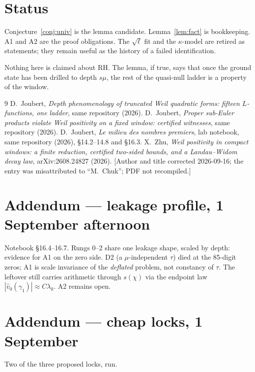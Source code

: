 \documentclass[10pt]{article}
\theoremstyle{definition}
\begin{document}
\section{Status}

Conjecture~\ref{conj:univ} is the lemma candidate. Lemma~\ref{lem:fact}
is bookkeeping. A1 and A2 are the proof obligations. The $\sqrt{\ell}$
fit and the $\kappa$-model are retired as statements; they remain
useful as the history of a failed identification.

Nothing here is claimed about RH. The lemma, if true, says that once
the ground state has been drilled to depth $s\mu$, the rest of the
quasi-null ladder is a property of the window.

\begin{thebibliography}{9}\small
{} D.~Joubert, \emph{Depth phenomenology of truncated Weil
quadratic forms: fifteen $L$-functions, one ladder}, same repository
(2026).
 D.~Joubert, \emph{Proper sub-Euler products violate
Weil positivity on a fixed window: certified witnesses}, same
repository (2026).
 D.~Joubert, \emph{Le milieu des nombres premiers}, lab
notebook, same repository (2026), \S14.2--14.8 and \S16.3.
 X.~Zhu, \emph{Weil positivity in compact windows: a
finite reduction, certified two-sided bounds, and a Landau--Widom decay
law}, arXiv:2608.24827 (2026). [Author and title corrected 2026-09-16;
the entry was misattributed to ``M.~Chuk''; PDF not recompiled.]
\end{thebibliography}

\section*{Addendum --- leakage profile, 1 September afternoon}

Notebook \S16.4--16.7. Rungs 0--2 share one leakage shape, scaled by
depth: evidence for A1 on the zero side. D2 (a $\mu$-independent
$\tau$) died at the 85-digit zeros; A1 is scale invariance of the
\emph{deflated} problem, not constancy of $\tau$. The leftover still
carries arithmetic through $s(\chi)$ via the endpoint law
$|\hat v_0(\gamma_1)|\approx C\lambda_0$. A2 remains open.

\section*{Addendum --- cheap locks, 1 September}

Two of the three proposed locks, run.
\end{document}
